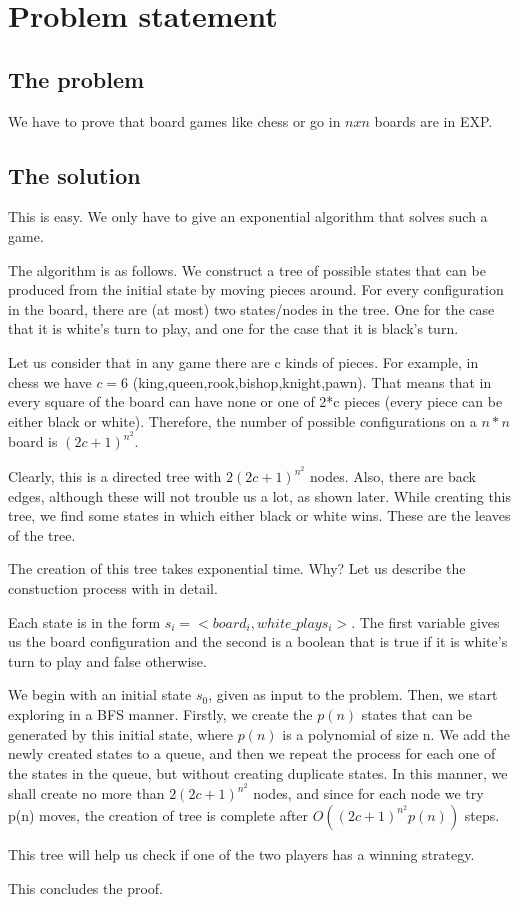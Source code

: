 \section*{Problem statement}
\subsection*{The problem}

We have to prove that board games like chess or go in $nxn$ boards are in EXP.

\subsection*{The solution}

This is easy. We only have to give an exponential algorithm that solves such a 
game. 

The algorithm is as follows. We construct a tree of possible states
that can be produced from the initial state by moving pieces around. 
For every configuration in the board, there are (at most) two states/nodes in the
tree. One for the case that it is white's turn to play, and one for the 
case that it is black's turn. 

Let us consider that in any game there are c kinds of pieces. For example, in chess we have $c=6$ (king,queen,rook,bishop,knight,pawn). That means that in 
every square of the board can have none or one of 2*c pieces (every piece can 
be either black or white).  Therefore, the number of possible 
configurations on a $n*n$ board is $(2c+1)^{n^2}$. 

Clearly, this is a directed tree with $2(2c+1)^{n^2}$ nodes. Also, there are back edges, although these will not trouble us a lot, as shown later. While 
creating this tree, we find some states in which either black or white 
wins. These are the leaves of the tree. 

The creation of this tree takes exponential time. Why? Let us describe the 
constuction process with in detail.

Each state is in the form $s_i= <board_i, white\_plays_i>$. The first variable gives us the board configuration and 
the second is a boolean that is true if it is white's turn to play and false otherwise. 

We begin with an initial state $s_0$, given as input to the problem. Then, we start exploring in a BFS manner. Firstly, we 
create the $p(n)$ states that can be generated by this initial state, where $p(n)$ is a polynomial of size n. We add the newly
created states to a queue, and then we repeat the process for each one of the states in the queue, but without creating 
duplicate states. In this manner, we shall create no more than $2(2c+1)^{n^2}$ nodes, and since for each node we 
try p(n) moves, the creation of tree is complete after $O((2c+1)^{n^2}p(n))$ steps.

This tree will help us check if one of the two players has a winning strategy.

This concludes the proof.
